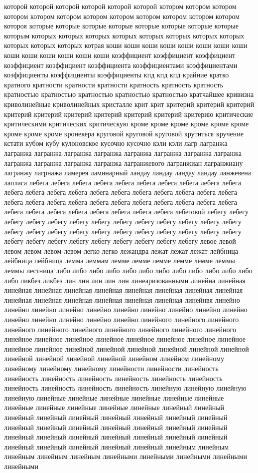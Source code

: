 которой которой которой которой которой которой котором котором котором котором котором котором котором котором котором котором котором котором котороя которые которые которые которые которые которые которые которые которым которых которых которых которых которых которых которых которых которых которых которых котрая коши коши коши коши коши коши коши коши коши коши коши коши коши коши коэффициент коэффициент коэффициент коэффициент коэффициент коэффициента коэффициентами коэффициентами коэффициенты коэффициенты коэффициенты кпд кпд кпд крайние кратко кратного кратности кратности кратности кратность кратность кратность кратностью кратностью кратностью кратностью кратностью кратчайшее кривизна криволинейные криволинейных кристалле крит крит критерий критерий критерий критерий критерий критерий критерий критерий критерий критерию критические критическими критических критическую кроме кроме кроме кроме кроме кроме кроме кроме кроме кронекера круговой круговой круговой крутиться кручение кстати кубом кубу кулоновское кусочно кусочно кэли кэли лагр лагранжа лагранжа лагранжа лагранжа лагранжа лагранжа лагранжа лагранжа лагранжа лагранжа лагранжа лагранжа лагранжа лагранжевого лагранжиан лагранжиану лагранжу лагрнажа ламерея ламинарный ландау ландау ландау ландау ланжевена лапласа лебега лебега лебега лебега лебега лебега лебега лебега лебега лебега лебега лебега лебега лебега лебега лебега лебега лебега лебега лебега лебега лебега лебега лебега лебега лебега лебега лебега лебега лебега лебега лебега лебега лебега лебега лебега лебега лебега лебега лебега лебеговой лебегу лебегу лебегу лебегу лебегу лебегу лебегу лебегу лебегу лебегу лебегу лебегу лебегу лебегу лебегу лебегу лебегу лебегу лебегу лебегу лебегу лебегу лебегу лебегу лебегу лебегу лебегу лебегу лебегу лебегу лебегу лебегу лебегу левое левой левом левом левом левом легко легко лежандра лежат лежат лежат лейбница лейбница лейбница лемма леммам лемме лемме лемме лемме лемме леммы леммы лестница либо либо либо либо либо либо либо либо либо либо либо либо либо ликбез ликбез лин лин лин лин лин линеаризованными линейна линейная линейная линейная линейная линейная линейная линейная линейная линейная линейная линейная линейная линейная линейная линейная линейнвя линейно линейно линейно линейно линейно линейно линейно линейно линейно линейно линейно линейно линейно линейно линейно линейного линейного линейного линейного линейного линейного линейного линейного линейного линейного линейное линейное линейное линейное линейное линейное линейное линейное линейное линейное линейной линейной линейной линейной линейной линейной линейной линейной линейной линейной линейном линейном линейному линейному линейному линейному линейности линейности линейность линейность линейность линейность линейность линейность линейность линейность линейность линейность линейность линейную линейную линейную линейную линейные линейные линейные линейные линейные линейные линейные линейные линейные линейные линейные линейный линейный линейный линейный линейный линейный линейный линейный линейный линейный линейный линейный линейный линейный линейный линейный линейный линейный линейный линейный линейный линейный линейный линейный линейный линейный линейный линейный линейным линейным линейным линейным линейным линейными линейными линейными линейными линейными 